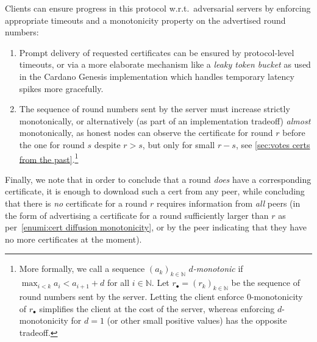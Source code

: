 Clients can ensure progress in this protocol w.r.t.\ adversarial servers by enforcing appropriate timeouts and a monotonicity property on the advertised round numbers:
\begin{enumerate}
\item
  Prompt delivery of requested certificates can be ensured by protocol-level timeouts, or via a more elaborate mechanism like a \emph{leaky token bucket} as used in the Cardano Genesis implementation  \parencite{genesis-implementation-documentation} which handles temporary latency spikes more gracefully.
\item\label{enumi:cert diffusion monotonicity}
  The sequence of round numbers sent by the server must increase strictly monotonically, or alternatively (as part of an implementation tradeoff) \emph{almost} monotonically, as honest nodes can observe the certificate for round $r$ before the one for round $s$ despite $r>s$, but only for small $r-s$, see \cref{sec:votes certs from the past}.\footnote{
  More formally, we call a sequence ${(a_k)}_{k\in \mathbb{N}}$ \emph{$d$-monotonic} if $\max_{i<k} a_i < a_{i+1} + d$ for all $i\in \mathbb{N}$.
  Let $r_\bullet = {(r_k)}_{k\in\mathbb{N}}$ be the sequence of round numbers sent by the server.
  Letting the client enforce $0$-monotonicity of $r_\bullet$ simplifies the client at the cost of the server, whereas enforcing $d$-monotonicity for $d=1$ (or other small positive values) has the opposite tradeoff.
}
\end{enumerate}

Finally, we note that in order to conclude that a round \emph{does} have a corresponding certificate, it is enough to download such a cert from any peer, while concluding that there is \emph{no} certificate for a round $r$ requires information from \emph{all} peers (in the form of advertising a certificate for a round sufficiently larger than $r$ as per~\ref{enumi:cert diffusion monotonicity}, or by the peer indicating that they have no more certificates at the moment).

